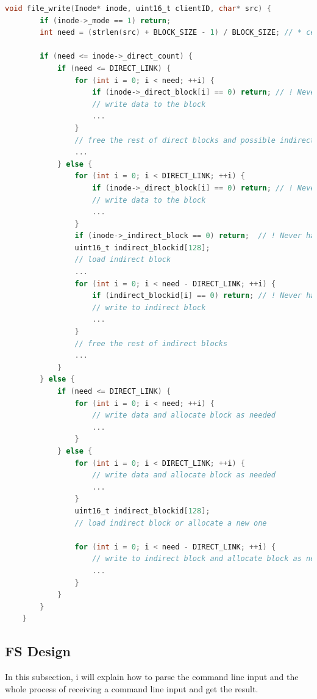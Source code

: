\begin{lstlisting}[language=C]
    void file_write(Inode* inode, uint16_t clientID, char* src) {
        if (inode->_mode == 1) return;
        int need = (strlen(src) + BLOCK_SIZE - 1) / BLOCK_SIZE; // * ceil(strlen(src) / BLOCK_SIZE)

        if (need <= inode->_direct_count) {
            if (need <= DIRECT_LINK) {
                for (int i = 0; i < need; ++i) {
                    if (inode->_direct_block[i] == 0) return; // ! Never happen
                    // write data to the block
                    ...
                }
                // free the rest of direct blocks and possible indirect block
                ...
            } else {
                for (int i = 0; i < DIRECT_LINK; ++i) {
                    if (inode->_direct_block[i] == 0) return; // ! Never happen
                    // write data to the block
                    ...
                }
                if (inode->_indirect_block == 0) return;  // ! Never happen
                uint16_t indirect_blockid[128];
                // load indirect block
                ...
                for (int i = 0; i < need - DIRECT_LINK; ++i) {
                    if (indirect_blockid[i] == 0) return; // ! Never happen
                    // write to indirect block
                    ...
                }
                // free the rest of indirect blocks
                ...
            }
        } else {
            if (need <= DIRECT_LINK) {
                for (int i = 0; i < need; ++i) {
                    // write data and allocate block as needed
                    ...
                }
            } else {
                for (int i = 0; i < DIRECT_LINK; ++i) {
                    // write data and allocate block as needed
                    ...
                }
                uint16_t indirect_blockid[128];
                // load indirect block or allocate a new one
                
                for (int i = 0; i < need - DIRECT_LINK; ++i) {
                    // write to indirect block and allocate block as needed
                    ...
                }
            }
        }
    }    
\end{lstlisting}

\subsection{FS Design}
In this subsection, i will explain how to parse the command line input and the whole process of receiving a command line input and get the result.

